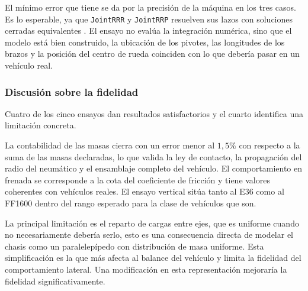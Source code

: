El mínimo error que tiene se da por la precisión de la máquina en los tres casos. Es lo esperable, ya que \verb|JointRRR| y \verb|JointRRP| resuelven sus lazos con soluciones cerradas equivalentes \cite{msl_multibody}. El ensayo no evalúa la integración numérica, sino que el modelo está bien construido, la ubicación de los pivotes, las longitudes de los brazos y la posición del centro de rueda coinciden con lo que debería pasar en un vehículo real.

\subsubsection{Discusión sobre la fidelidad}

Cuatro de los cinco ensayos dan resultados satisfactorios y el cuarto identifica una limitación concreta.

La contabilidad de las masas cierra con un error menor al $1{,}5\%$ con respecto a la suma de las masas declaradas, lo que valida la ley de contacto, la propagación del radio del neumático y el ensamblaje completo del vehículo. El comportamiento en frenada se corresponde a la cota del coeficiente de fricción y tiene valores coherentes con vehículos reales. El ensayo vertical sitúa tanto al E36 como al FF1600 dentro del rango esperado para la clase de vehículos que son.

La principal limitación es el reparto de cargas entre ejes, que es uniforme cuando no necesariamente debería serlo, esto es una consecuencia directa de modelar el chasis como un paralelepípedo con distribución de masa uniforme. Esta simplificación es la que más afecta al balance del vehículo y limita la fidelidad del comportamiento lateral. Una modificación en esta representación mejoraría la fidelidad significativamente.



